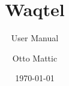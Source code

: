 \documentclass[Waqtel]{../../data/TelemacDoc} %
\begin{document}
\let\cleardoublepage\clearpage

\title{Waqtel}
\subtitle{User Manual}
\author{Otto Mattic}
\date{\today}
\maketitle
\clearpage



\newpage

\thispagestyle{empty}

\TelemacCopyright{}




\pagestyle{empty} %

\tableofcontents%


\pagestyle{fancy} %

\end{document}
